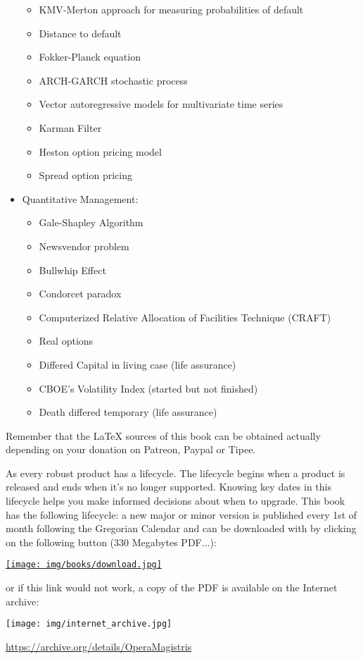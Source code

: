 \begin{itemize}
\begin{itemize}
				\item KMV-Merton approach for measuring probabilities of default
				\item Distance to default
				\item Fokker-Planck equation
				\item ARCH-GARCH stochastic process
				\item Vector autoregressive models for multivariate time series
				\item Karman Filter
				\item Heston option pricing model
				\item Spread option pricing
			\end{itemize}	
		\item Quantitative Management: 
			\begin{itemize}
				\item Gale-Shapley Algorithm
				\item Newsvendor problem
				\item Bullwhip Effect
				\item Condorcet paradox	
				\item Computerized Relative Allocation of Facilities Technique (CRAFT)			
				\item Real options
				\item Differed Capital in living case (life assurance)
				\item CBOE's Volatility Index (started but not finished)
				\item Death differed temporary (life assurance)
			\end{itemize}
	\end{itemize}
	Remember that the \LaTeX{} sources of this book can be obtained actually depending on your donation on Patreon, Paypal or Tipee.
	
	As every robust product has a lifecycle. The lifecycle begins when a product is released and ends when it's no longer supported. Knowing key dates in this lifecycle helps you make informed decisions about when to upgrade. This book has the following lifecycle: a new major or minor version is published every 1st of month following the Gregorian Calendar and can be downloaded with by clicking on the following button ($330$ Megabytes PDF...):
	\begin{center}
		\href{http://www.sciences.ch/htmlfr/php/cliccount/click.php?id=317}{\texttt{[image: img/books/download.jpg]}}
	\end{center}
	or if this link would not work, a copy of the PDF is available on the Internet archive:
	\begin{center}
		\texttt{[image: img/internet\_archive.jpg]}
	\end{center}
	\begin{center}
	\href{https://archive.org/details/OperaMagistris}{https://archive.org/details/OperaMagistris}
	\end{center}
	
